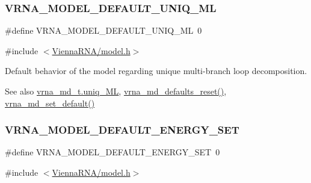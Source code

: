 \subsubsection{\texorpdfstring{V\+R\+N\+A\+\_\+\+M\+O\+D\+E\+L\+\_\+\+D\+E\+F\+A\+U\+L\+T\+\_\+\+U\+N\+I\+Q\+\_\+\+ML}{VRNA\_MODEL\_DEFAULT\_UNIQ\_ML}}
{\footnotesize\ttfamily \#define V\+R\+N\+A\+\_\+\+M\+O\+D\+E\+L\+\_\+\+D\+E\+F\+A\+U\+L\+T\+\_\+\+U\+N\+I\+Q\+\_\+\+ML~0}



{\ttfamily \#include $<$\mbox{\hyperlink{model_8h}{Vienna\+R\+N\+A/model.\+h}}$>$}



Default behavior of the model regarding unique multi-\/branch loop decomposition. 

\begin{DoxySeeAlso}{See also}
\mbox{\hyperlink{group__model__details_ade065b814a4e2e72ead93ab502613ed2}{vrna\+\_\+md\+\_\+t.\+uniq\+\_\+\+ML}}, \mbox{\hyperlink{group__model__details_ga70834424cf804d149937de89f80ceb45}{vrna\+\_\+md\+\_\+defaults\+\_\+reset()}}, \mbox{\hyperlink{group__model__details_ga8ac6ff84936282436f822644bf841f66}{vrna\+\_\+md\+\_\+set\+\_\+default()}} 
\end{DoxySeeAlso}
\mbox{\label{group__model__details_ga6fcf6b2d0f89256cdbd166486c9b6e1e}} 
\subsubsection{\texorpdfstring{V\+R\+N\+A\+\_\+\+M\+O\+D\+E\+L\+\_\+\+D\+E\+F\+A\+U\+L\+T\+\_\+\+E\+N\+E\+R\+G\+Y\+\_\+\+S\+ET}{VRNA\_MODEL\_DEFAULT\_ENERGY\_SET}}
{\footnotesize\ttfamily \#define V\+R\+N\+A\+\_\+\+M\+O\+D\+E\+L\+\_\+\+D\+E\+F\+A\+U\+L\+T\+\_\+\+E\+N\+E\+R\+G\+Y\+\_\+\+S\+ET~0}



{\ttfamily \#include $<$\mbox{\hyperlink{model_8h}{Vienna\+R\+N\+A/model.\+h}}$>$}



